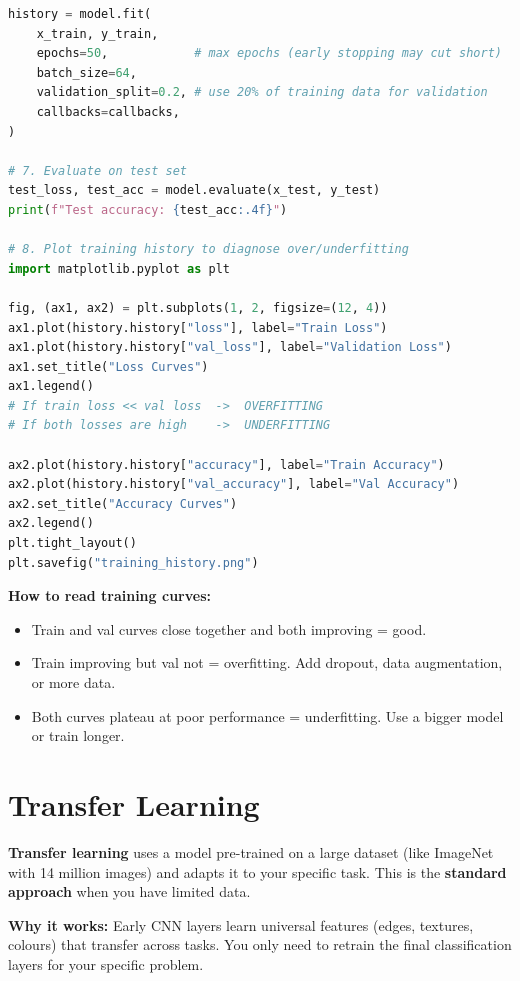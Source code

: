 \documentclass[12pt, a4paper, oneside]{book}
\begin{document}
\begin{lstlisting}[language=Python, caption={Complete CNN with data augmentation and callbacks}]
history = model.fit(
    x_train, y_train,
    epochs=50,            # max epochs (early stopping may cut short)
    batch_size=64,
    validation_split=0.2, # use 20% of training data for validation
    callbacks=callbacks,
)

# 7. Evaluate on test set
test_loss, test_acc = model.evaluate(x_test, y_test)
print(f"Test accuracy: {test_acc:.4f}")

# 8. Plot training history to diagnose over/underfitting
import matplotlib.pyplot as plt

fig, (ax1, ax2) = plt.subplots(1, 2, figsize=(12, 4))
ax1.plot(history.history["loss"], label="Train Loss")
ax1.plot(history.history["val_loss"], label="Validation Loss")
ax1.set_title("Loss Curves")
ax1.legend()
# If train loss << val loss  ->  OVERFITTING
# If both losses are high    ->  UNDERFITTING

ax2.plot(history.history["accuracy"], label="Train Accuracy")
ax2.plot(history.history["val_accuracy"], label="Val Accuracy")
ax2.set_title("Accuracy Curves")
ax2.legend()
plt.tight_layout()
plt.savefig("training_history.png")
\end{lstlisting}

\begin{notebox}
\textbf{How to read training curves:}
\begin{itemize}[leftmargin=2em]
    \item Train and val curves close together and both improving = good.
    \item Train improving but val not = overfitting. Add dropout, data augmentation, or more data.
    \item Both curves plateau at poor performance = underfitting. Use a bigger model or train longer.
\end{itemize}
\end{notebox}

\section{Transfer Learning}

\textbf{Transfer learning} uses a model pre-trained on a large dataset (like ImageNet with 14 million images) and adapts it to your specific task. This is the \textbf{standard approach} when you have limited data.

\textbf{Why it works:} Early CNN layers learn universal features (edges, textures, colours) that transfer across tasks. You only need to retrain the final classification layers for your specific problem.
\end{document}
